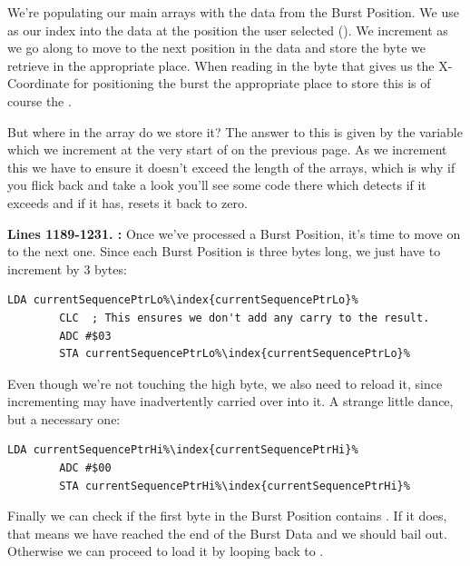 We're populating our main arrays with the data from the Burst Position. We use  as our index into the data at the position the user selected ().
We increment  as we go along to move to the next position in the data and store the byte we retrieve in the appropriate place. When reading in the byte
that gives us the X-Coordinate for positioning the burst the appropriate place to store this is of course the .

 But where in the array 
do we store it? The answer to this is given by the variable  which we increment at the very start of  on the 
previous page. As we increment this we have to ensure it doesn't exceed the length of the arrays, which is why if you flick back and take a look you'll see some
code there which detects if it exceeds  and if it has, resets it back to zero.

\textbf{Lines 1189-1231. :} Once we've processed a Burst Position, it's time to move on to the next one. Since each Burst Position
is three bytes long, we just have to increment  by 3 bytes:
\begin{lstlisting}[escapechar=\%]
        LDA currentSequencePtrLo%\index{currentSequencePtrLo}%
        CLC  ; This ensures we don't add any carry to the result.
        ADC #$03
        STA currentSequencePtrLo%\index{currentSequencePtrLo}%
\end{lstlisting}

Even though we're not touching the high byte, we also need to reload it, since incrementing  may have inadvertently carried over into it.
A strange little dance, but a necessary one:
\begin{lstlisting}[escapechar=\%]
        LDA currentSequencePtrHi%\index{currentSequencePtrHi}%
        ADC #$00
        STA currentSequencePtrHi%\index{currentSequencePtrHi}%
\end{lstlisting}

Finally we can check if the first byte in the Burst Position contains . If it does, that means we have reached the end of the Burst Data and we should bail out.
Otherwise we can proceed to load it by looping back to .


